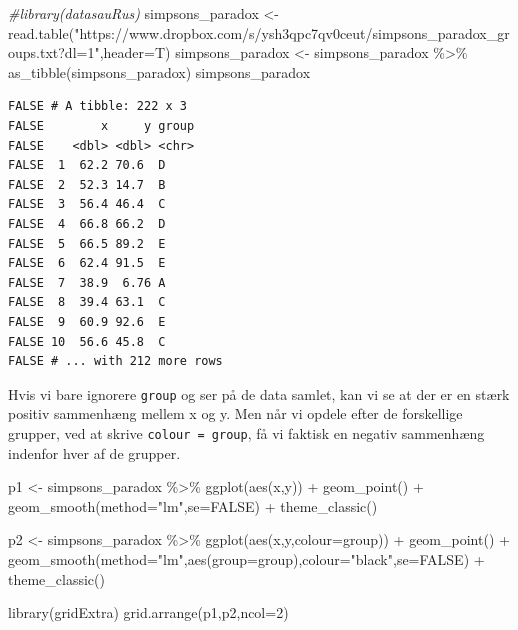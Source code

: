 \documentclass[
]{book}
\newenvironment{Shaded}{\begin{snugshade}}{\end{snugshade}}
\newcommand{\AttributeTok}[1]{\textcolor[rgb]{0.77,0.63,0.00}{#1}}
\newcommand{\CommentTok}[1]{\textcolor[rgb]{0.56,0.35,0.01}{\textit{#1}}}
\newcommand{\ConstantTok}[1]{\textcolor[rgb]{0.00,0.00,0.00}{#1}}
\newcommand{\DecValTok}[1]{\textcolor[rgb]{0.00,0.00,0.81}{#1}}
\newcommand{\FunctionTok}[1]{\textcolor[rgb]{0.00,0.00,0.00}{#1}}
\newcommand{\NormalTok}[1]{#1}
\newcommand{\OtherTok}[1]{\textcolor[rgb]{0.56,0.35,0.01}{#1}}
\newcommand{\SpecialCharTok}[1]{\textcolor[rgb]{0.00,0.00,0.00}{#1}}
\newcommand{\StringTok}[1]{\textcolor[rgb]{0.31,0.60,0.02}{#1}}
\begin{document}
\begin{Shaded}
\begin{Highlighting}[]
\CommentTok{\#library(datasauRus)}
\NormalTok{simpsons\_paradox }\OtherTok{\textless{}{-}} \FunctionTok{read.table}\NormalTok{(}\StringTok{"https://www.dropbox.com/s/ysh3qpc7qv0ceut/simpsons\_paradox\_groups.txt?dl=1"}\NormalTok{,}\AttributeTok{header=}\NormalTok{T)}
\NormalTok{simpsons\_paradox }\OtherTok{\textless{}{-}}\NormalTok{ simpsons\_paradox }\SpecialCharTok{\%\textgreater{}\%} \FunctionTok{as\_tibble}\NormalTok{(simpsons\_paradox)}
\NormalTok{simpsons\_paradox}
\end{Highlighting}
\end{Shaded}

\begin{verbatim}
FALSE # A tibble: 222 x 3
FALSE        x     y group
FALSE    <dbl> <dbl> <chr>
FALSE  1  62.2 70.6  D    
FALSE  2  52.3 14.7  B    
FALSE  3  56.4 46.4  C    
FALSE  4  66.8 66.2  D    
FALSE  5  66.5 89.2  E    
FALSE  6  62.4 91.5  E    
FALSE  7  38.9  6.76 A    
FALSE  8  39.4 63.1  C    
FALSE  9  60.9 92.6  E    
FALSE 10  56.6 45.8  C    
FALSE # ... with 212 more rows
\end{verbatim}

Hvis vi bare ignorere \texttt{group} og ser på de data samlet, kan vi se at der er en stærk positiv sammenhæng mellem x og y. Men når vi opdele efter de forskellige grupper, ved at skrive \texttt{colour\ =\ group}, få vi faktisk en negativ sammenhæng indenfor hver af de grupper.

\begin{Shaded}
\begin{Highlighting}[]
\NormalTok{p1 }\OtherTok{\textless{}{-}}\NormalTok{ simpsons\_paradox }\SpecialCharTok{\%\textgreater{}\%} 
  \FunctionTok{ggplot}\NormalTok{(}\FunctionTok{aes}\NormalTok{(x,y)) }\SpecialCharTok{+} 
  \FunctionTok{geom\_point}\NormalTok{() }\SpecialCharTok{+}
  \FunctionTok{geom\_smooth}\NormalTok{(}\AttributeTok{method=}\StringTok{"lm"}\NormalTok{,}\AttributeTok{se=}\ConstantTok{FALSE}\NormalTok{) }\SpecialCharTok{+}
  \FunctionTok{theme\_classic}\NormalTok{()}

\NormalTok{p2 }\OtherTok{\textless{}{-}}\NormalTok{ simpsons\_paradox }\SpecialCharTok{\%\textgreater{}\%} 
  \FunctionTok{ggplot}\NormalTok{(}\FunctionTok{aes}\NormalTok{(x,y,}\AttributeTok{colour=}\NormalTok{group)) }\SpecialCharTok{+} 
  \FunctionTok{geom\_point}\NormalTok{() }\SpecialCharTok{+}
  \FunctionTok{geom\_smooth}\NormalTok{(}\AttributeTok{method=}\StringTok{"lm"}\NormalTok{,}\FunctionTok{aes}\NormalTok{(}\AttributeTok{group=}\NormalTok{group),}\AttributeTok{colour=}\StringTok{"black"}\NormalTok{,}\AttributeTok{se=}\ConstantTok{FALSE}\NormalTok{) }\SpecialCharTok{+}
  \FunctionTok{theme\_classic}\NormalTok{()}

\FunctionTok{library}\NormalTok{(gridExtra)}
\FunctionTok{grid.arrange}\NormalTok{(p1,p2,}\AttributeTok{ncol=}\DecValTok{2}\NormalTok{)}
\end{Highlighting}
\end{Shaded}
\end{document}
